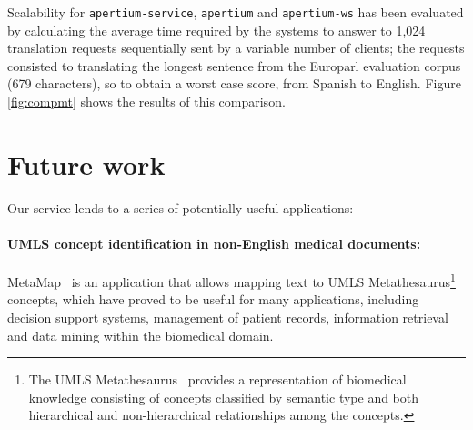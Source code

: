\documentclass[11pt]{article}
\begin{document}
Scalability for {\tt\small apertium-service}, {\tt\small apertium} and {\tt\small apertium-ws} has been evaluated by calculating the average time required by the systems to answer to 1,024 translation requests sequentially sent by a variable number of clients; the requests consisted to translating the longest sentence from the Europarl evaluation corpus (679 characters), so to obtain a worst case score, from Spanish to English. Figure \ref{fig:compmt} shows the results of this comparison.



\section{Future work}


Our service lends to a series of potentially useful applications:

\paragraph{UMLS concept identification in non-English medical documents:} MetaMap~\citep{metamap} is an application that allows mapping text to UMLS Metathesaurus\footnote{The UMLS Metathesaurus~\citep{umls} provides a representation of biomedical knowledge consisting of concepts classified by semantic type and both hierarchical and non-hierarchical relationships among the concepts.} concepts, which have proved to be useful for many applications, including decision support systems, management of patient records, information retrieval and data mining within the biomedical domain.

\end{document}
